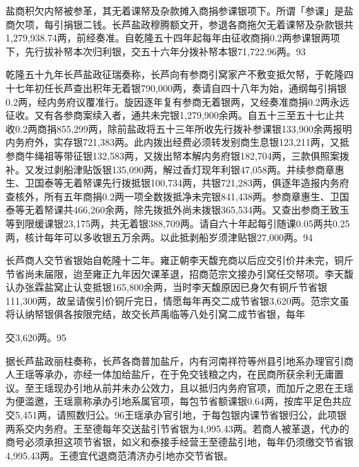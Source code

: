 盐商积欠内帑被参革，其无着课帑及杂款摊入商捐参课银项下。所谓「参课」是盐商欠项，每引捐银二钱。长芦盐政穆腾额文开，参退各商拖欠无着课帑及杂款银共1,279,938.74两，前经奏准。自乾隆五十四年起每年由征收商捐0.2两参课银两项下，先行拔补帑本次归利银，交五十六年分拨补帑本银71,722.96两。93

乾隆五十九年长芦盐政征瑞奏称，长芦向有参商引窝家产不敷变抵欠帑，于乾隆四十七年初任长芦查出积年无着银790,000两，奏请自四十八年为始，通纲每引捐银0.2两，经内务府议覆准行。旋因逐年复有参商无着银两，又经奏准商捐0.2两永远征收。又有各参商案续入者，通共未完银1,279,900余两。自五十三至五十七止共收0.2两商捐855,299两，除前盐政将五十三年所收先行拨补参课银133,900余两报明内务府外，实存银721,383两。此内拨出经费必须转发别商生息银123,211两，又抵参商牛绳祖等带征银132,583两，又拨出帑本解内务府银182,704两，三款俱照案拨补。又发过剥船津贴饭银135,090两，解过香灯现年利银47,058两。并续参商章惠生、卫国泰等无着帑课先行拨抵银100,734两，共银721,283两，俱逐年造报内务府查核外，所有五年商捐0.2两一项全数拨抵净未完银841,438两。参商章惠生、卫国泰等无着帑课共466,260余两，除先拨抵外尚未拨银365,534两。又查出参商王致玉等到限缓课银23,175两，共无着银388,709两。请自六十年起每引随课0.05两共0.25两，核计每年可以多收银五万余两。以此抵剥船岁须津贴银27,000两。94


长芦商人交节省银始自乾隆十二年。雍正朝李天馥充商以后应交引价并未完，铜斤节省尚未届限，迨至雍正九年因欠课革退，招商范宗文接办引窝任交帑项。李天馥认办张霖盐窝止认变抵银165,800余两，当时李天馥原因已身欠有铜斤节省银111,300两，故呈请俟引价铜斤完日，情愿每年再交二成节省银3,620两。范宗文虽将认纳帑银俱各按限完结，故交长芦禹临等八处引窝二成节省银，每年

\vfill
\begin{BookNotes}
\end{BookNotes}

\noindent 交3,620两。95

据长芦盐政丽柱奏称，长芦各商普加盐斤，内有河南祥符等州县引地系办理官引商人王瑶等承办，亦经一体加给盐斤，在于免交钱粮之内，在民商所获余利无庸置议。至王瑶现办引地从前并未办公效力，且以抵归内务府官项，而加斤之恩在王瑶为便滥邀，王瑶禀称承办引地系属官项，每包节省额课银0.64两，按库平足色共应交5,451两，请照数归公。96王瑶承办官引地，于每包银内课节省银归公，此项银两系交内务府。王至德每年交送盐引节省银为4,995.43两。若商人被革退，代办的商号必须承担这项节省银，如义和泰接手经营王至德盐引地，每年仍须缴交节省银4,995.43两。王德宜代退商范清济办引地亦交节省银。

